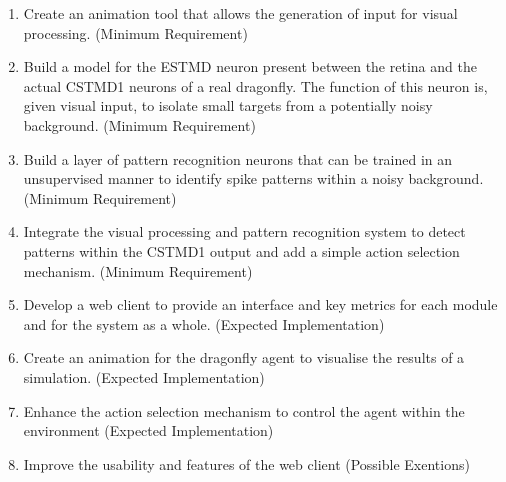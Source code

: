 \documentclass[a4paper,11pt]{article}
\begin{document}
\begin{enumerate}

 \item{Create an animation tool that allows the generation of input for visual processing. (Minimum 
Requirement)}

\item{Build a model for the ESTMD neuron present between the retina and the actual CSTMD1 
neurons of a real dragonfly. The function of this neuron is, given visual input, to isolate small targets 
from a potentially noisy background. (Minimum Requirement)}  

\item{Build a layer of pattern recognition neurons that can be trained in an unsupervised manner to 
identify spike patterns within a noisy background. (Minimum Requirement)}

\item{Integrate the visual processing and pattern recognition system to detect patterns within the
CSTMD1 output and add a simple action selection mechanism. (Minimum Requirement)}

\item{Develop a web client to provide an interface and key metrics for each module and for the 
system as a whole.  (Expected Implementation)}

\item{Create an animation for the dragonfly agent to visualise the results of a simulation. (Expected 
Implementation)}

\item{Enhance the action selection mechanism to control the agent within the environment 
(Expected Implementation)}

\item{Improve the usability and features of the web client (Possible Exentions)}

\end{enumerate}
\end{document}

